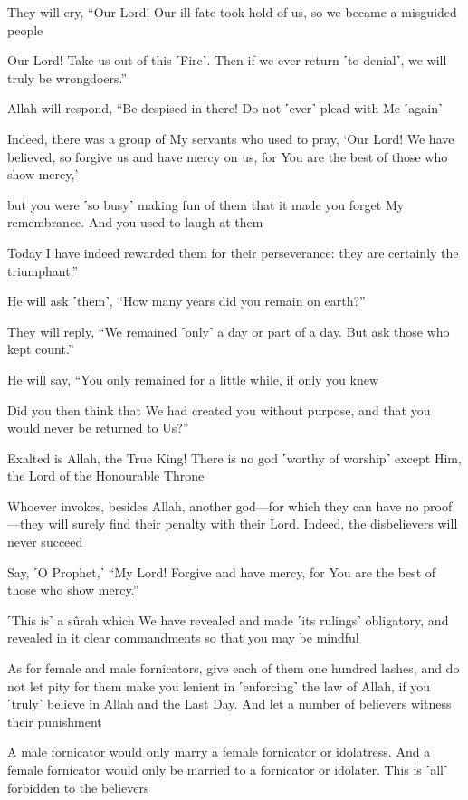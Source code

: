 They will cry, “Our Lord! Our ill-fate took hold of us, so we became a misguided people

Our Lord! Take us out of this ˹Fire˺. Then if we ever return ˹to denial˺, we will truly be wrongdoers.”

Allah will respond, “Be despised in there! Do not ˹ever˺ plead with Me ˹again˺

Indeed, there was a group of My servants who used to pray, ‘Our Lord! We have believed, so forgive us and have mercy on us, for You are the best of those who show mercy,’

but you were ˹so busy˺ making fun of them that it made you forget My remembrance. And you used to laugh at them

Today I have indeed rewarded them for their perseverance: they are certainly the triumphant.”

He will ask ˹them˺, “How many years did you remain on earth?”

They will reply, “We remained ˹only˺ a day or part of a day. But ask those who kept count.”

He will say, “You only remained for a little while, if only you knew

Did you then think that We had created you without purpose, and that you would never be returned to Us?”

Exalted is Allah, the True King! There is no god ˹worthy of worship˺ except Him, the Lord of the Honourable Throne

Whoever invokes, besides Allah, another god—for which they can have no proof—they will surely find their penalty with their Lord. Indeed, the disbelievers will never succeed

Say, ˹O Prophet,˺ “My Lord! Forgive and have mercy, for You are the best of those who show mercy.”

˹This is˺ a sûrah which We have revealed and made ˹its rulings˺ obligatory, and revealed in it clear commandments so that you may be mindful

As for female and male fornicators, give each of them one hundred lashes, and do not let pity for them make you lenient in ˹enforcing˺ the law of Allah, if you ˹truly˺ believe in Allah and the Last Day. And let a number of believers witness their punishment

A male fornicator would only marry a female fornicator or idolatress. And a female fornicator would only be married to a fornicator or idolater. This is ˹all˺ forbidden to the believers

